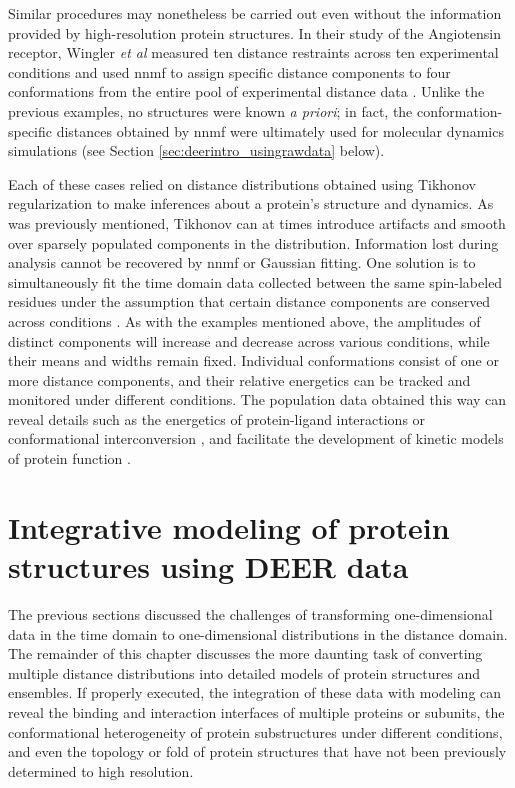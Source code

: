 Similar procedures may nonetheless be carried out even without the information provided by high-resolution protein structures. In their study of the Angiotensin receptor, Wingler \emph{et al} measured ten distance restraints across ten experimental conditions and used \gls{nnmf} to assign specific distance components to four conformations from the entire pool of experimental distance data \citep*{Wingler2019}. Unlike the previous examples, no structures were known \emph{a priori}; in fact, the conformation-specific distances obtained by \gls{nnmf} were ultimately used for molecular dynamics simulations (see Section \ref{sec:deerintro_usingrawdata} below).

Each of these cases relied on distance distributions obtained using Tikhonov regularization to make inferences about a protein's structure and dynamics. As was previously mentioned, Tikhonov can at times introduce artifacts and smooth over sparsely populated components in the distribution. Information lost during analysis cannot be recovered by \gls{nnmf} or Gaussian fitting. One solution is to simultaneously fit the time domain data collected between the same spin-labeled residues under the assumption that certain distance components are conserved across conditions \citep*{Brandon2012}. As with the examples mentioned above, the amplitudes of distinct components will increase and decrease across various conditions, while their means and widths remain fixed. Individual conformations consist of one or more distance components, and their relative energetics can be tracked and monitored under different conditions. The population data obtained this way can reveal details such as the energetics of protein-ligand interactions \citep*{Collauto2017, Dastvan2019} or conformational interconversion \citep*{Dastvan2016a, Jagessar2020, Martens2016, Verhalen2017a}, and facilitate the development of kinetic models of protein function \citep*{Collauto2017, Paz2018}.

\section{Integrative modeling of protein structures using DEER data}

The previous sections discussed the challenges of transforming one-dimensional data in the time domain to one-dimensional distributions in the distance domain. The remainder of this chapter discusses the more daunting task of converting multiple distance distributions into detailed models of protein structures and ensembles. If properly executed, the integration of these data with modeling can reveal the binding and interaction interfaces of multiple proteins or subunits, the conformational heterogeneity of protein substructures under different conditions, and even the topology or fold of protein structures that have not been previously determined to high resolution. 

